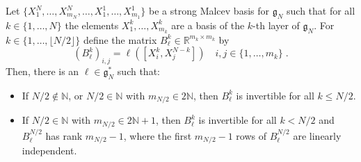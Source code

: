 \documentclass[10pt,a4paper]{amsart}
\newcommand{\fancyg}{\mathfrak{g}}
\begin{document}
	\begin{proposition}\label{prop: existence of invertible matrix}
		Let $\{X_1^N, \ldots, X_{m_N}^N, \ldots,X_1^1, \ldots, X_{m_1}^1\}$ be a strong Malcev basis for $\fancyg_N$ such that for all $k \in \{1, \ldots, N\}$ the elements $X_1^k, \ldots, X_{m_k}^k$ are a basis of the $k$-th layer of $\fancyg_N$. For $k \in \{1,\ldots, \lfloor N/2 \rfloor\}$ define the matrix $B_{\ell}^k \in \mathbb{R}^{m_k\times m_k}$ by
		\[(B_{\ell}^k)_{i,j} = \ell([X_i^k,X_j^{N-k}]) \quad i,j \in \{1, \ldots, m_k\} \;.\]
		Then, there is an $\ell \in \fancyg_N^*$ such that:
		\begin{itemize}
			\item[i)] If $N/2 \notin \mathbb{N}$, or $N/2 \in \mathbb{N}$ with $m_{N/2} \in 2\mathbb{N}$, then $B_{\ell}^k$ is invertible for all $k \leq N/2$.
			\item[ii)] If $N/2 \in  \mathbb{N}$ with $m_{N/2} \in 2\mathbb{N}+1$, then $B_{\ell}^k$ is invertible for all $k<N/2$ and $B_{\ell}^{N/2}$ has rank $m_{N/2}-1$, where the first $m_{N/2}-1$ rows of $B_{\ell}^{N/2}$ are linearly independent.
		\end{itemize}
	\end{proposition}
\end{document}
